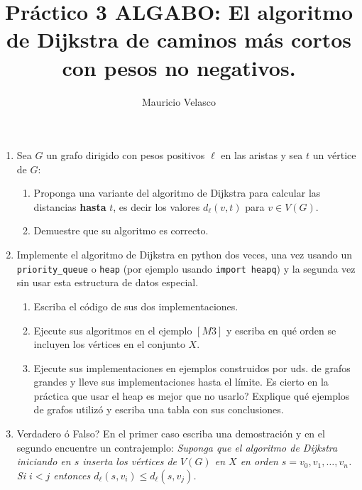 \documentclass[12pt, a4paper]{article}
\date{}
\begin{document}
\title{Pr\'actico 3 ALGABO: El algoritmo de Dijkstra de caminos m\'as cortos con pesos no negativos.}
\author{Mauricio Velasco}
\maketitle{}
\begin{enumerate} 

\item Sea $G$ un grafo dirigido con pesos positivos $\ell$ en las aristas y sea $t$ un v\'ertice de $G$:
\begin{enumerate}
\item  Proponga una variante del algoritmo de Dijkstra para calcular las distancias {\bf hasta } $t$, es decir los valores $d_{\ell}(v,t)$ para $v\in V(G)$. 
\item Demuestre que su algoritmo es correcto.
\end{enumerate}

\item Implemente el algoritmo de Dijkstra en python dos veces, una vez usando un \verb!priority_queue! o \verb!heap! (por ejemplo usando \verb!import heapq!) y la segunda vez sin usar esta estructura de datos especial.
\begin{enumerate}
\item Escriba el c\'odigo de sus dos implementaciones.
\item Ejecute sus algoritmos en el ejemplo $[M3]$ y escriba en qu\'e orden se incluyen los v\'ertices en el conjunto $X$.
\item Ejecute sus implementaciones en ejemplos construidos por uds. de grafos grandes y lleve sus implementaciones hasta el l\'imite. Es cierto en la pr\'actica que usar el heap es mejor que no usarlo? Explique qu\'e ejemplos de grafos utiliz\'o y escriba una tabla con sus conclusiones.
\end{enumerate}

\item Verdadero \'o Falso? En el primer caso escriba una demostraci\'on y en el segundo encuentre un contrajemplo: {\it Suponga que el algoritmo de Dijkstra iniciando en $s$ inserta los v\'ertices de $V(G)$ en $X$ en orden  $s=v_0,v_1,\dots, v_n$. Si $i<j$ entonces $d_{\ell}(s,v_i)\leq d_{\ell}(s,v_j)$.}



\end{enumerate}
\end{document}
